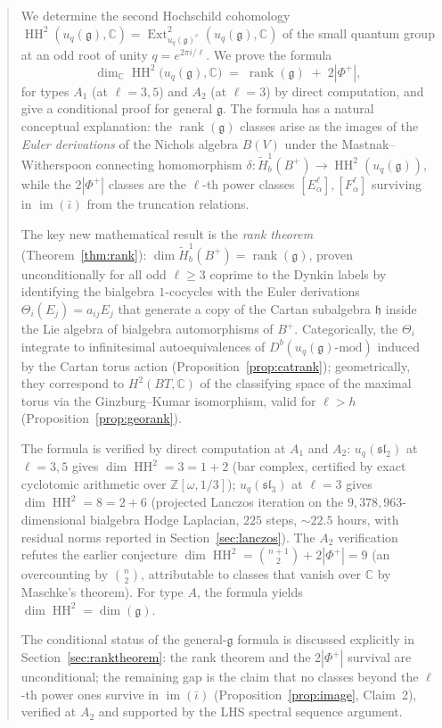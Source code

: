 \documentclass[11pt,letterpaper]{amsart}
\theoremstyle{plain}
\theoremstyle{definition}
\theoremstyle{remark}
\newcommand{\HH}{\operatorname{HH}}
\newcommand{\Ext}{\operatorname{Ext}}
\newcommand{\CC}{\mathbb{C}}
\begin{document}
\begin{abstract}
We determine the second Hochschild cohomology $\HH^2(u_q(\mathfrak{g}), \CC) = \Ext^2_{u_q(\mathfrak{g})^e}(u_q(\mathfrak{g}), \CC)$ of the small quantum group at an odd root of unity $q = e^{2\pi i/\ell}$. We prove the formula
\[
  \dim_\CC \HH^2\bigl(u_q(\mathfrak{g}), \CC\bigr) \;=\; \operatorname{rank}(\mathfrak{g}) \;+\; 2|\Phi^+|,
\]
for types $A_1$ (at $\ell = 3, 5$) and $A_2$ (at $\ell = 3$) by direct computation, and give a conditional proof for general $\mathfrak{g}$. The formula has a natural conceptual explanation: the $\operatorname{rank}(\mathfrak{g})$ classes arise as the images of the \emph{Euler derivations} of the Nichols algebra $B(V)$ under the Mastnak--Witherspoon connecting homomorphism $\delta \colon \tilde{H}^1_b(B^+) \to \HH^2(u_q(\mathfrak{g}))$, while the $2|\Phi^+|$ classes are the $\ell$-th power classes $[E_\alpha^\ell], [F_\alpha^\ell]$ surviving in $\operatorname{im}(\bar\iota)$ from the truncation relations.

The key new mathematical result is the \emph{rank theorem} (Theorem~\ref{thm:rank}): $\dim \tilde{H}^1_b(B^+) = \operatorname{rank}(\mathfrak{g})$, proven unconditionally for all odd $\ell \geq 3$ coprime to the Dynkin labels by identifying the bialgebra $1$-cocycles with the Euler derivations $\Theta_i(E_j) = a_{ij} E_j$ that generate a copy of the Cartan subalgebra $\mathfrak{h}$ inside the Lie algebra of bialgebra automorphisms of $B^+$. Categorically, the $\Theta_i$ integrate to infinitesimal autoequivalences of $D^b(u_q(\mathfrak{g})\text{-mod})$ induced by the Cartan torus action (Proposition~\ref{prop:catrank}); geometrically, they correspond to $H^2(BT, \CC)$ of the classifying space of the maximal torus via the Ginzburg--Kumar isomorphism, valid for $\ell > h$ (Proposition~\ref{prop:georank}).

The formula is verified by direct computation at $A_1$ and $A_2$: $u_q(\mathfrak{sl}_2)$ at $\ell = 3, 5$ gives $\dim \HH^2 = 3 = 1 + 2$ (bar complex, certified by exact cyclotomic arithmetic over $\mathbb{Z}[\omega, 1/3]$); $u_q(\mathfrak{sl}_3)$ at $\ell = 3$ gives $\dim \HH^2 = 8 = 2 + 6$ (projected Lanczos iteration on the $9{,}378{,}963$-dimensional bialgebra Hodge Laplacian, $225$ steps, $\sim 22.5$ hours, with residual norms reported in Section~\ref{sec:lanczos}). The $A_2$ verification refutes the earlier conjecture $\dim \HH^2 = \binom{n+1}{2} + 2|\Phi^+| = 9$ (an overcounting by $\binom{n}{2}$, attributable to classes that vanish over $\CC$ by Maschke's theorem). For type $A$, the formula yields $\dim \HH^2 = \dim(\mathfrak{g})$.

The conditional status of the general-$\mathfrak{g}$ formula is discussed explicitly in Section~\ref{sec:ranktheorem}: the rank theorem and the $2|\Phi^+|$ survival are unconditional; the remaining gap is the claim that no classes beyond the $\ell$-th power ones survive in $\operatorname{im}(\bar\iota)$ (Proposition~\ref{prop:image}, Claim~2), verified at $A_2$ and supported by the LHS spectral sequence argument.
\end{abstract}
\end{document}
